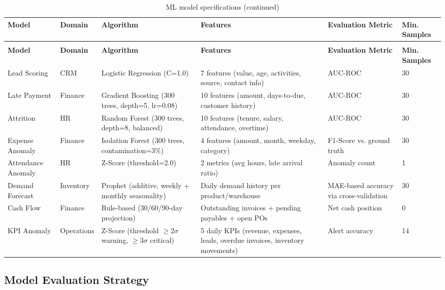 \documentclass[12pt,a4paper]{report}
\begin{document}
\begin{longtable}{p{2.5cm} p{2cm} p{2.5cm} p{2.5cm} p{2cm} p{1.5cm}}
\caption{ML model specifications} \label{tab:ml_models} \\
\toprule
\textbf{Model} & \textbf{Domain} & \textbf{Algorithm} & \textbf{Features} & \textbf{Evaluation Metric} & \textbf{Min. Samples} \\
\midrule
\endfirsthead
\caption[]{ML model specifications (continued)} \\
\toprule
\textbf{Model} & \textbf{Domain} & \textbf{Algorithm} & \textbf{Features} & \textbf{Evaluation Metric} & \textbf{Min. Samples} \\
\midrule
\endhead
Lead Scoring & CRM & Logistic Regression (C=1.0) & 7 features (value, age, activities, source, contact info) & AUC-ROC & 30 \\
\addlinespace
Late Payment & Finance & Gradient Boosting (300 trees, depth=5, lr=0.08) & 10 features (amount, days-to-due, customer history) & AUC-ROC & 30 \\
\addlinespace
Attrition & HR & Random Forest (300 trees, depth=8, balanced) & 10 features (tenure, salary, attendance, overtime) & AUC-ROC & 30 \\
\addlinespace
Expense Anomaly & Finance & Isolation Forest (300 trees, contamination=3\%) & 4 features (amount, month, weekday, category) & F1-Score vs. ground truth & 30 \\
\addlinespace
Attendance Anomaly & HR & Z-Score (threshold=2.0) & 2 metrics (avg hours, late arrival ratio) & Anomaly count & 1 \\
\addlinespace
Demand Forecast & Inventory & Prophet (additive, weekly + monthly seasonality) & Daily demand history per product/warehouse & MAE-based accuracy via cross-validation & 30 \\
\addlinespace
Cash Flow & Finance & Rule-based (30/60/90-day projection) & Outstanding invoices + pending payables + open POs & Net cash position & 0 \\
\addlinespace
KPI Anomaly & Operations & Z-Score (threshold $\geq 2\sigma$ warning, $\geq 3\sigma$ critical) & 5 daily KPIs (revenue, expenses, leads, overdue invoices, inventory movements) & Alert accuracy & 14 \\
\bottomrule
\end{longtable}

\subsection{Model Evaluation Strategy}
\end{document}

